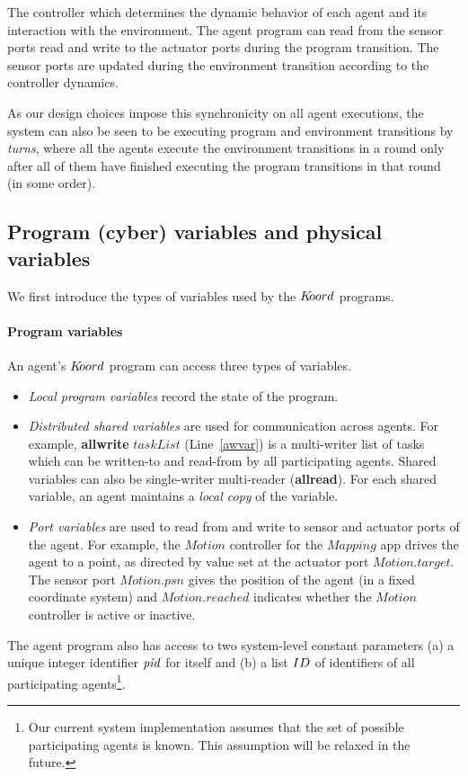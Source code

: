 The controller which determines the dynamic behavior of each agent and its interaction with the environment. The agent program can read from the sensor ports read and write to the actuator ports during the program transition. The sensor ports are updated during the environment transition according to the controller dynamics. 


As our design choices impose this synchronicity on all agent executions, the system can also be seen to be executing program and environment transitions by \emph{turns}, where all the agents execute the environment transitions in a round only after all of them have finished executing the program transitions in that round (in some order). 

 
\subsection{Program (cyber) variables and physical variables}
\label{sec:variables}
We first introduce the types of variables used by the $K\kern-2pt oord$ programs. 

\paragraph{Program variables}
An agent's $K\kern-2pt oord$ program can access three types of variables. 
%
\begin{itemize}
	\item {\em Local program variables\/} record the state of the program. 
\item {\em Distributed shared variables\/} are used for communication across agents.  For example, {\bf allwrite} $\mathit{taskList}$ (Line~\ref{awvar}) is a multi-writer list of tasks which can be written-to and read-from by all participating agents. Shared variables can also be single-writer multi-reader ({\bf allread}). For each shared variable, an agent maintains a {\em local copy\/}  of the variable. 

\item {\em Port variables\/} are used to read from and write to sensor and actuator ports of the agent. For example, the $\mathit{Motion}$ controller for the $\mathit{Mapping}$ app  drives the agent  to a point, as directed by value set at the actuator port $\mathit{Motion.target}$. The sensor port $\mathit{Motion.psn}$ gives the position of the agent (in a fixed coordinate system) and $\mathit{Motion.reached}$ indicates  whether the $\mathit{Motion}$ controller is active or inactive.
\end{itemize}

The agent program also has access to two system-level constant parameters (a) a unique integer identifier $\mathit{pid}$ for itself and (b) a list $ID$ of identifiers of all participating agents\footnote{Our current system implementation assumes that the set of possible participating agents is known. This assumption will be relaxed in the future.}. 


